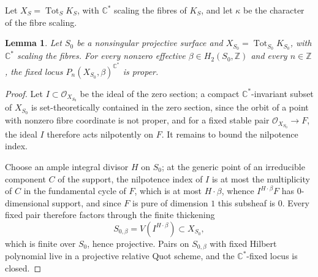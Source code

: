 \documentclass{amsart}
\newtheorem{lemma}{Lemma}
\theoremstyle{definition}
\numberwithin{equation}{section}
\newcommand{\C}{\mathbb C}
\newcommand{\Z}{\mathbb Z}
\newcommand{\cO}{\mathcal O}
\newcommand{\Tot}{\operatorname{Tot}}
\begin{document}
Let \(X_S=\Tot_S K_S\), with \(\C^*\) scaling the fibres of \(K_S\), and let \(\kappa\) be the character of the fibre scaling.

\begin{lemma}
\label{lem:rational-elliptic-fixed-proper}
Let \(S_0\) be a nonsingular projective surface and \(X_{S_0}=\Tot_{S_0}K_{S_0}\), with \(\C^*\) scaling the fibres.  For every nonzero effective \(\beta\in H_2(S_0,\Z)\) and every \(n\in\Z\), the fixed locus \(P_n(X_{S_0},\beta)^{\C^*}\) is proper.
\end{lemma}

\begin{proof}
Let \(I\subset\cO_{X_{S_0}}\) be the ideal of the zero section; a compact \(\C^*\)-invariant subset of \(X_{S_0}\) is set-theoretically contained in the zero section, since the orbit of a point with nonzero fibre coordinate is not proper, and for a fixed stable pair \(\cO_{X_{S_0}}\to F\), the ideal \(I\) therefore acts nilpotently on \(F\).  It remains to bound the nilpotence index.

Choose an ample integral divisor \(H\) on \(S_0\); at the generic point of an irreducible component \(C\) of the support, the nilpotence index of \(I\) is at most the multiplicity of \(C\) in the fundamental cycle of \(F\), which is at most \(H\cdot\beta\), whence \(I^{H\cdot\beta}F\) has \(0\)-dimensional support, and since \(F\) is pure of dimension \(1\) this subsheaf is \(0\).  Every fixed pair therefore factors through the finite thickening
\[
 S_{0,\beta}=V(I^{H\cdot\beta})\subset X_{S_0},
\]
which is finite over \(S_0\), hence projective.  Pairs on \(S_{0,\beta}\) with fixed Hilbert polynomial live in a projective relative Quot scheme, and the \(\C^*\)-fixed locus is closed.
\end{proof}
\end{document}
